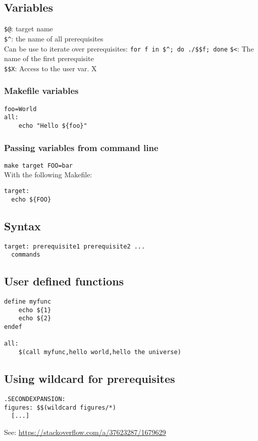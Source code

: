 \subsection{Variables}
\verb|$@|: target name\\
\verb|$^|: the name of all prerequisites\\
Can be use to iterate over prerequisites: \verb|for f in $^; do ./$$f; done|
\verb|$<|: The name of the first prerequisite\\
\verb|$$X|: Access to the user var. X\\
\subsubsection{Makefile variables}
\begin{verbatim}
foo=World
all:
    echo "Hello ${foo}"
\end{verbatim}

\subsubsection{Passing variables from command line}
\verb|make target FOO=bar|\\
With the following Makefile:
\begin{verbatim}
target:
  echo ${FOO}
\end{verbatim}

\subsection{Syntax}
\begin{verbatim}
target: prerequisite1 prerequisite2 ...
  commands
\end{verbatim}

\subsection{User defined functions}
\begin{verbatim}
define myfunc
    echo ${1}
    echo ${2}
endef

all:
    $(call myfunc,hello world,hello the universe)
\end{verbatim}

\subsection{Using wildcard for prerequisites}
\begin{verbatim}
.SECONDEXPANSION:
figures: $$(wildcard figures/*)
  [...]
\end{verbatim}
See: \url{https://stackoverflow.com/a/37623287/1679629}
